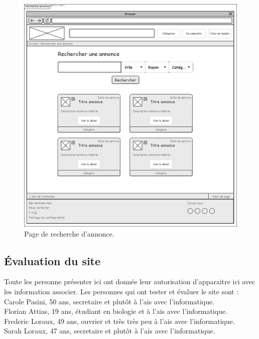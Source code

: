 \documentclass[a4paper,11pt]{article}
\begin{document}
\begin{figure}[H]
  \includegraphics[width=\linewidth]{images/maquette-recherche.png}
  \caption{Page de recherche d'annonce.}
  \label{fig:maquette-recherche}
\end{figure}
\newpage


\subsection{Évaluation du site}

Toute les personne présenter ici ont donnée leur autorisation d'apparaitre ici avec les information associer.
Les personnes qui ont tester et évaluer le site sont :\\

Carole Pasini, 50 ans, secretaire et plutôt à l'ais avec l'informatique.\\
Florian Attias, 19 ans, étudiant en biologie et à l'ais avec l'informatique.\\
Frederic Loraux, 49 ans, ouvrier et très très peu à l'ais avec l'informatique.\\
Sarah Loraux, 47 ans, secretaire et plutôt à l'ais avec l'informatique.\\
\end{document}
